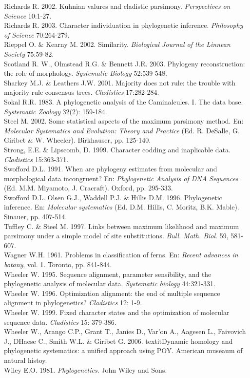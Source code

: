 Richards R. 2002. Kuhnian valures and cladistic parsimony. \textit{Perspectives on Science} 10:1-27.\\
Richards R. 2003. Character individuation in phylogenetic inference. \textit{Philosophy of Science} 70:264-279.\\
Rieppel O. \& Kearny M. 2002. Similarity. \textit{Biological Journal of the Linnean Society} 75:59-82.\\ 
Scotland R. W., Olmstead R.G. \& Bennett J.R. 2003. Phylogeny reconstruction: the role of morphology. \textit{Systematic Biology} 52:539-548.\\
Sharkey M.J. \& Leathers J.W. 2001. Majority does not rule: the trouble with majority-rule consensus trees. \textit{Cladistics} 17:282-284.\\
Sokal R.R. 1983. A phylogenetic analysis of the Caminalcules. I. The data base. \textit{Systematic Zoology} 32(2): 159-184.\\
Steel M. 2002. Some statistical aspects of the maximum parsimony method. En: \textit{Molecular Systematics and Evolution: Theory and Practice} (Ed. R. DeSalle, G. Giribet \& W. Wheeler). Birkhauser, pp. 125-140.\\
Strong, E.E. \& Lipscomb, D. 1999. Character codding and inaplicable data. \textit{Cladistics} 15:363-371.\\
Swofford D.L. 1991. When are phylogeny estimates from molecular and morphological data incongruent? En: \textit{Phylogenetic Analysis of DNA Sequences} (Ed. M.M. Miyamoto, J. Cracraft). Oxford, pp. 295-333.\\
Swofford D.L. Olsen G.J., Waddell P.J. \& Hillis D.M. 1996. Phylogenetic inference. En: \textit{Molecular systematics} (Ed. D.M. Hillis, C. Moritz, B.K. Mable). Sinauer, pp. 407-514.\\
Tuffley C. \& Steel M. 1997. Links between maximum likelihood and maximum parsimony under a simple model of site substitutions. \textit{Bull. Math. Biol}. 59, 581-607.\\
Wagner W.H. 1961. Problems in classification of ferns. En: \textit{Recent advances in botany}, vol. 1. Toronto, pp. 841-844.\\
Wheeler W. 1995. Sequence alignment, parameter sensibility, and the phylogenetic analysis of molecular data. \textit{Systematic biology} 44:321-331.\\
Wheeler W. 1996. Optimization alignment: the end of multiple sequence alignment in phylogenetics? \textit{Cladistics} 12: 1-9.\\
Wheeler W. 1999. Fixed character states and the optimization of molecular sequence data. \textit{Cladistics} 15: 379-386.\\
Wheeler W., Arango C.P., Grant T., Janies D., Var'on A., Aagesen L., Faivovich J., DHaese C., Smith W.L. \& Giribet G. 2006. textit{Dynamic homology and phylogenetic systematics: a unified approach using POY}. American museaum of natural histoy.\\
Wiley E.O. 1981. \textit{Phylogenetics}. John Wiley and Sons.\\
